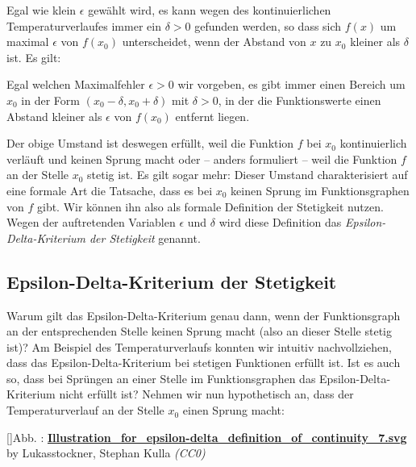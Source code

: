 \documentclass[fontsize=9pt,
               parskip=half-,
               DIV=14,
               listof=chapterentry,
               tocflat]{scrbook}
\newcounter{imagelabel}
\begin{document}
Egal wie klein $\epsilon $ gewählt wird, es kann wegen des kontinuierlichen Temperaturverlaufes immer ein $\delta >0$ gefunden werden, so dass sich $f(x)$ um maximal $\epsilon $ von $f(x_{0})$ unterscheidet, wenn der Abstand von $x$ zu $x_{0}$ kleiner als $\delta $ ist. Es gilt:

\begin{importantparagraph*}
Egal welchen Maximalfehler $\epsilon >0$ wir vorgeben, es gibt immer einen Bereich um $x_{0}$ in der Form $(x_{0}-\delta ,x_{0}+\delta )$ mit $\delta >0$, in der die Funktionswerte einen Abstand kleiner als $\epsilon $ von $f(x_{0})$ entfernt liegen.

\end{importantparagraph*}

Der obige Umstand ist deswegen erfüllt, weil die Funktion $f$ bei $x_{0}$ kontinuierlich verläuft und keinen Sprung macht oder – anders formuliert – weil die Funktion $f$ an der Stelle $x_{0}$ stetig ist. Es gilt sogar mehr: Dieser Umstand charakterisiert auf eine formale Art die Tatsache, dass es bei $x_{0}$ keinen Sprung im Funktionsgraphen von $f$ gibt. Wir können ihn also als formale Definition der Stetigkeit nutzen. Wegen der auftretenden Variablen $\epsilon $ und $\delta $ wird diese Definition das \emph{Epsilon-Delta-Kriterium der Stetigkeit} genannt.

\subsection{Epsilon-Delta-Kriterium der Stetigkeit}

Warum gilt das Epsilon-Delta-Kriterium genau dann, wenn der Funktionsgraph an der entsprechenden Stelle keinen Sprung macht (also an dieser Stelle stetig ist)? Am Beispiel des Temperaturverlaufs konnten wir intuitiv nachvollziehen, dass das Epsilon-Delta-Kriterium bei stetigen Funktionen erfüllt ist. Ist es auch so, dass bei Sprüngen an einer Stelle im Funktionsgraphen das Epsilon-Delta-Kriterium nicht erfüllt ist? Nehmen wir nun hypothetisch an, dass der Temperaturverlauf an der Stelle $x_{0}$ einen Sprung macht:

[]{Abb. : \protect\href{https://commons.wikimedia.org/wiki/File:Illustration_for_epsilon-delta_definition_of_continuity_7.svg}{\textbf{Illustration\allowbreak\_for\allowbreak\_epsilon\allowbreak-delta\allowbreak\_definition\allowbreak\_of\allowbreak\_continuity\allowbreak\_7.svg}} by Lukasstockner, Stephan Kulla \textit{(CC0)}}\begin{center}
\end{center}
\end{document}
